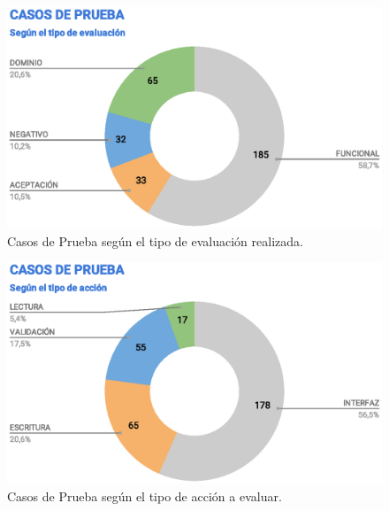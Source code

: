 \begin{figure}
\centering
\includegraphics[width=1.0\textwidth]{graphics/tc-tests.eps}
\caption{Casos de Prueba según el tipo de evaluación realizada.}
\label{tc-tests}
\end{figure}

\begin{figure}
\centering
\includegraphics[width=1.0\textwidth]{graphics/tc-type.eps}
\caption{Casos de Prueba según el tipo de acción a evaluar.}
\label{tc-type}
\end{figure}

